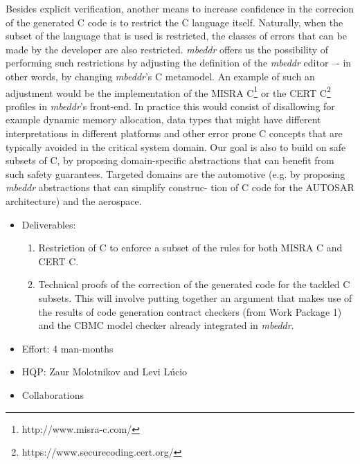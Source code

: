 Besides explicit verification, another means to increase confidence in the
correcion of the generated C code is to restrict the C language itself.
Naturally, when the subset of the language that is used is restricted, the
classes of errors that can be made by the developer are also restricted. \emph{mbeddr}
offers us the possibility of performing such restrictions by adjusting the
definition of the \emph{mbeddr} editor –- in other words, by changing \emph{mbeddr}’s C
metamodel. An example of such an adjustment would be the implementation of the
MISRA C\footnote{http://www.misra-c.com/} or the CERT
C\footnote{https://www.securecoding.cert.org/} profiles in \emph{mbeddr}’s front-end.
In practice this would consist of disallowing for example dynamic memory
allocation, data types that might have different interpretations in different
platforms and other error prone C concepts that are typically avoided in the
critical system domain.
Our goal is also to build on safe subsets of C, by proposing domain-specific
abstractions that can benefit from such safety guarantees. Targeted domains are
the automotive (e.g. by proposing \emph{mbeddr} abstractions that can simplify
construc- tion of C code for the AUTOSAR architecture) and the
aerospace.


\begin{itemize}
  \item Deliverables:
  \begin{enumerate}
    \item Restriction of C to enforce a subset of the rules for both MISRA C and
    CERT C.
\item Technical proofs of the correction of the generated code for the tackled C
subsets. This will involve putting together an argument that makes use of the
results of code generation contract checkers (from Work Package 1) and the CBMC
model checker already integrated in \emph{mbeddr}.
  \end{enumerate}
  \item Effort: 4 man-months
  \item HQP: Zaur Molotnikov and Levi L\'ucio
  \item Collaborations
\end{itemize}